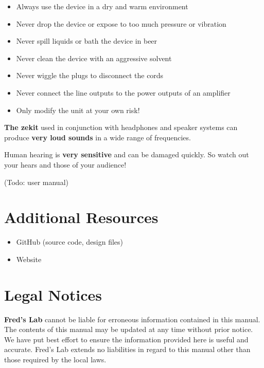 \documentclass{scrartcl}
\begin{document}
\begin{itemize}
    \item Always use the device in a dry and warm environment
    \item Never drop the device or expose to too much pressure or vibration
    \item Never spill liquids or bath the device in beer
    \item Never clean the device with an aggressive solvent
    \item Never wiggle the plugs to disconnect the cords
    \item Never connect the line outputs to the power outputs of an amplifier
    \item Only modify the unit at your own risk!
\end{itemize}

\textbf{The zekit} used in conjunction with headphones and speaker systems can produce \textbf{very loud sounds} in a wide range of frequencies.

Human hearing is \textbf{very sensitive} and can be damaged quickly. So watch out your hears and those of your audience!

(Todo: user manual)


\section{Additional Resources}

\begin{itemize}
    \item GitHub (source code, design files)
    \item Website
\end{itemize}

\pagebreak


\section{Legal Notices}

\textbf{Fred's Lab} cannot be liable for erroneous information contained in this manual. The contents of this manual may be updated at any time without prior notice. We have put best effort to ensure the information provided here is useful and accurate. Fred's Lab extends no liabilities in regard to this manual other than those required by the local laws.
\end{document}
